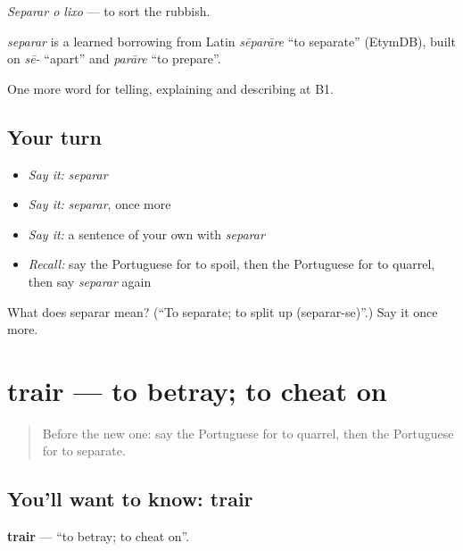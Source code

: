 \emph{Separar o lixo} — to sort the rubbish.

\begin{cousinweb}
\emph{separar} is a learned borrowing from Latin \emph{sēparāre} \textquotedblleft{}to separate\textquotedblright{} (EtymDB), built on \emph{sē-} \textquotedblleft{}apart\textquotedblright{} and \emph{parāre} \textquotedblleft{}to prepare\textquotedblright{}.
\end{cousinweb}

\begin{grammarlens}[title={What you've built}]
One more word for telling, explaining and describing at B1.
\end{grammarlens}

\subsection*{Your turn}
\begin{itemize}
\raggedright
  \item \emph{Say it:} \emph{separar}
  \item \emph{Say it:} \emph{separar}, once more
  \item \emph{Say it:} a sentence of your own with \emph{separar}
  \item \emph{Recall:} say the Portuguese for to spoil, then the Portuguese for to quarrel, then say \emph{separar} again
\end{itemize}

\begin{tcolorbox}[breakable,colback=teal!4,colframe=teal!35!black,title={Before you move on}]
What does separar mean? (\textquotedblleft{}To separate; to split up (separar-se)\textquotedblright{}.) Say it once more.
\end{tcolorbox}
\section[trair]{trair — to betray; to cheat on}

\label{lesson:PT-C497-trair}



\begin{quote}
Before the new one: say the Portuguese for to quarrel, then the Portuguese for to separate.
\end{quote}

\subsection*{You'll want to know: trair}
\textbf{trair} — \textquotedblleft{}to betray; to cheat on\textquotedblright{}.

